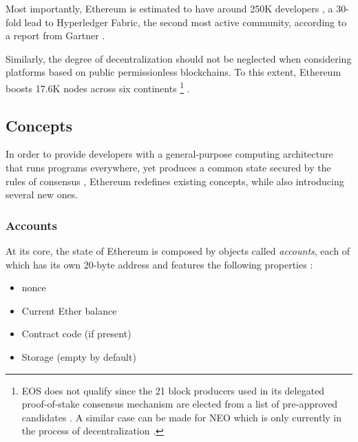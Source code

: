 Most importantly, Ethereum is estimated to have around 250K developers \cite{ethereumNetworkState}, a 30-fold lead to Hyperledger Fabric, the second most active community, according to a report from Gartner \cite{bloomberg2017}. 

Similarly, the degree of decentralization should not be neglected when considering platforms based on public permissionless blockchains. To this extent, Ethereum boosts 17.6K nodes across six continents \footnote{EOS does not qualify since the 21 block producers used in its delegated proof-of-stake consensus mechanism are elected from a list of pre-approved candidates \cite[p.~6]{eosWhitepaper} \cite{eosBlockproducers}. A similar case can be made for NEO which is only currently in the process of decentralization \cite{neoDecentralization} \cite{neoConsensus}.} \cite{ethernodes}.  



\subsection{Concepts}
In order to provide developers with a general-purpose computing architecture that runs programs everywhere, yet produces a common state secured by the rules of consensus \cite[p.~31]{Antonopoulos.2018}, Ethereum redefines existing concepts, while also introducing several new ones.

\subsubsection{Accounts}
\label{sec:accounts}
At its core, the state of Ethereum is composed by objects called \textit{accounts}, each of which has its own 20-byte address and features the following properties \cite[p.~17]{ethereumWhitepaperGitHub}: 

\begin{itemize}
  \item \Gls{nonce}
  \item Current Ether balance
  \item Contract code (if present)
  \item Storage (empty by default)
\end{itemize}

